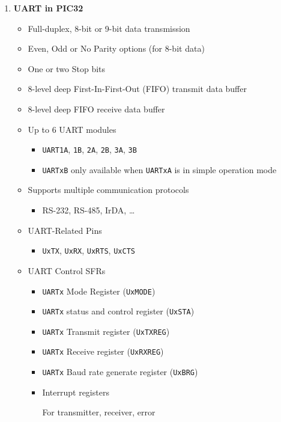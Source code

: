 \documentclass[a4paper]{article}
\begin{document}
\begin{enumerate}[label = \arabic*.]
    \item \textbf{UART in PIC32}
      \begin{itemize}[leftmargin = 1cm]
        \item Full-duplex, 8-bit or 9-bit data transmission
        \item Even, Odd or No Parity options (for 8-bit data)
        \item One or two Stop bits
        \item 8-level deep First-In-First-Out (FIFO) transmit data buffer
        \item 8-level deep FIFO receive data buffer
        \item Up to 6 UART modules
          \begin{itemize}[leftmargin = 1cm]
            \item \verb|UART1A|, \verb|1B|, \verb|2A|, \verb|2B|, \verb|3A|, \verb|3B|
            \item \verb|UARTxB| only available when \verb|UARTxA| is in simple operation mode
          \end{itemize}
        \item Supports multiple communication protocols
          \begin{itemize}[leftmargin = 1cm]
            \item RS-232, RS-485, IrDA, \dots
          \end{itemize}
        \item UART-Related Pins
          \begin{itemize}[leftmargin = 1cm]
            \item \verb|UxTX|, \verb|UxRX|, \verb|UxRTS|, \verb|UxCTS|
          \end{itemize}
        \item UART Control SFRs
          \begin{itemize}[leftmargin = 1cm]
            \item \verb|UARTx| Mode Register (\verb|UxMODE|)
            \item \verb|UARTx| status and control register (\verb|UxSTA|)
            \item \verb|UARTx| Transmit register (\verb|UxTXREG|)
            \item \verb|UARTx| Receive register (\verb|UxRXREG|)
            \item \verb|UARTx| Baud rate generate register (\verb|UxBRG|)
            \item Interrupt registers
              \par For transmitter, receiver, error
          \end{itemize}
      \end{itemize}


\end{enumerate}
\end{document}
